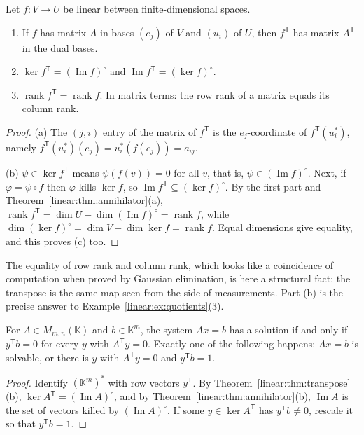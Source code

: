 \begin{theorem}\label{linear:thm:transpose}
Let $f:V\to U$ be linear between finite-dimensional spaces.
\begin{enumerate}[label=(\alph*)]
\item If $f$ has matrix $A$ in bases $(e_j)$ of $V$ and $(u_i)$ of $U$, then $f^{\mathsf T}$ has matrix $A^{\mathsf T}$ in
the dual bases.
\item $\ker f^{\mathsf T}=(\operatorname{Im}f)^\circ$ and $\operatorname{Im}f^{\mathsf T}=(\ker f)^\circ$.
\item $\operatorname{rank}f^{\mathsf T}=\operatorname{rank}f$. In matrix terms: the row rank of a matrix equals its column
rank.
\end{enumerate}
\end{theorem}
\begin{proof}
(a) The $(j,i)$ entry of the matrix of $f^{\mathsf T}$ is the $e_j$-coordinate of $f^{\mathsf T}(u_i^*)$, namely
$f^{\mathsf T}(u_i^*)(e_j)=u_i^*(f(e_j))=a_{ij}$.

(b) $\psi\in\ker f^{\mathsf T}$ means $\psi(f(v))=0$ for all $v$, that is, $\psi\in(\operatorname{Im}f)^\circ$. Next, if
$\varphi=\psi\circ f$ then $\varphi$ kills $\ker f$, so $\operatorname{Im}f^{\mathsf T}\subseteq(\ker f)^\circ$. By the
first part and Theorem~\ref{linear:thm:annihilator}(a),
$\operatorname{rank}f^{\mathsf T}=\dim U-\dim(\operatorname{Im}f)^\circ=\operatorname{rank}f$, while
$\dim(\ker f)^\circ=\dim V-\dim\ker f=\operatorname{rank}f$. Equal dimensions give equality, and this proves (c) too.
\end{proof}

The equality of row rank and column rank, which looks like a coincidence of computation when proved by Gaussian
elimination, is here a structural fact: the transpose is the same map seen from the side of measurements. Part (b) is the
precise answer to Example~\ref{linear:ex:quotients}(3).

\begin{corollary}\label{linear:cor:fredholm}
For $A\in M_{m,n}(\mathbb K)$ and $b\in\mathbb K^m$, the system $Ax=b$ has a solution if and only if $y^{\mathsf T}b=0$ for
every $y$ with $A^{\mathsf T}y=0$. Exactly one of the following happens: $Ax=b$ is solvable, or there is $y$ with
$A^{\mathsf T}y=0$ and $y^{\mathsf T}b=1$.
\end{corollary}
\begin{proof}
Identify $(\mathbb K^m)^*$ with row vectors $y^{\mathsf T}$. By Theorem~\ref{linear:thm:transpose}(b),
$\ker A^{\mathsf T}=(\operatorname{Im}A)^\circ$, and by Theorem~\ref{linear:thm:annihilator}(b), $\operatorname{Im}A$ is the set
of vectors killed by $(\operatorname{Im}A)^\circ$. If some $y\in\ker A^{\mathsf T}$ has $y^{\mathsf T}b\ne0$, rescale it so that
$y^{\mathsf T}b=1$.
\end{proof}

